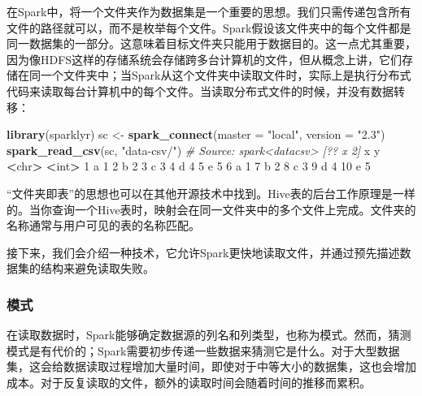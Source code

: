 \documentclass[
]{article}
\newenvironment{Shaded}{\begin{snugshade}}{\end{snugshade}}
\newcommand{\CommentTok}[1]{\textcolor[rgb]{0.56,0.35,0.01}{\textit{#1}}}
\newcommand{\DataTypeTok}[1]{\textcolor[rgb]{0.13,0.29,0.53}{#1}}
\newcommand{\DecValTok}[1]{\textcolor[rgb]{0.00,0.00,0.81}{#1}}
\newcommand{\ErrorTok}[1]{\textcolor[rgb]{0.64,0.00,0.00}{\textbf{#1}}}
\newcommand{\KeywordTok}[1]{\textcolor[rgb]{0.13,0.29,0.53}{\textbf{#1}}}
\newcommand{\NormalTok}[1]{#1}
\newcommand{\OperatorTok}[1]{\textcolor[rgb]{0.81,0.36,0.00}{\textbf{#1}}}
\newcommand{\StringTok}[1]{\textcolor[rgb]{0.31,0.60,0.02}{#1}}
\begin{document}
在Spark中，将一个文件夹作为数据集是一个重要的思想。我们只需传递包含所有文件的路径就可以，而不是枚举每个文件。Spark假设该文件夹中的每个文件都是同一数据集的一部分。这意味着目标文件夹只能用于数据目的。这一点尤其重要，因为像HDFS这样的存储系统会存储跨多台计算机的文件，但从概念上讲，它们存储在同一个文件夹中；当Spark从这个文件夹中读取文件时，实际上是执行分布式代码来读取每台计算机中的每个文件。当读取分布式文件的时候，并没有数据转移：

\begin{Shaded}
\begin{Highlighting}[]
\KeywordTok{library}\NormalTok{(sparklyr)}
\NormalTok{sc <-}\StringTok{ }\KeywordTok{spark_connect}\NormalTok{(}\DataTypeTok{master =} \StringTok{"local"}\NormalTok{, }\DataTypeTok{version =} \StringTok{"2.3"}\NormalTok{)}
\KeywordTok{spark_read_csv}\NormalTok{(sc, }\StringTok{"data-csv/"}\NormalTok{)}
\CommentTok{# Source: spark<datacsv> [?? x 2]}
\NormalTok{ x y}
 \OperatorTok{<}\NormalTok{chr}\OperatorTok{>}\StringTok{ }\ErrorTok{<}\NormalTok{int}\OperatorTok{>}
\StringTok{ }\DecValTok{1}\NormalTok{ a }\DecValTok{1}
 \DecValTok{2}\NormalTok{ b }\DecValTok{2}
 \DecValTok{3}\NormalTok{ c }\DecValTok{3}
 \DecValTok{4}\NormalTok{ d }\DecValTok{4}
 \DecValTok{5}\NormalTok{ e }\DecValTok{5}
 \DecValTok{6}\NormalTok{ a }\DecValTok{1}
 \DecValTok{7}\NormalTok{ b }\DecValTok{2}
 \DecValTok{8}\NormalTok{ c }\DecValTok{3}
 \DecValTok{9}\NormalTok{ d }\DecValTok{4}
\DecValTok{10}\NormalTok{ e }\DecValTok{5}
\end{Highlighting}
\end{Shaded}

``文件夹即表''的思想也可以在其他开源技术中找到。Hive表的后台工作原理是一样的。当你查询一个Hive表时，映射会在同一文件夹中的多个文件上完成。文件夹的名称通常与用户可见的表的名称匹配。

接下来，我们会介绍一种技术，它允许Spark更快地读取文件，并通过预先描述数据集的结构来避免读取失败。

\hypertarget{ux6a21ux5f0f}{%
\subsubsection{模式}\label{ux6a21ux5f0f}}

在读取数据时，Spark能够确定数据源的列名和列类型，也称为模式。然而，猜测模式是有代价的；Spark需要初步传递一些数据来猜测它是什么。对于大型数据集，这会给数据读取过程增加大量时间，即使对于中等大小的数据集，这也会增加成本。对于反复读取的文件，额外的读取时间会随着时间的推移而累积。
\end{document}
